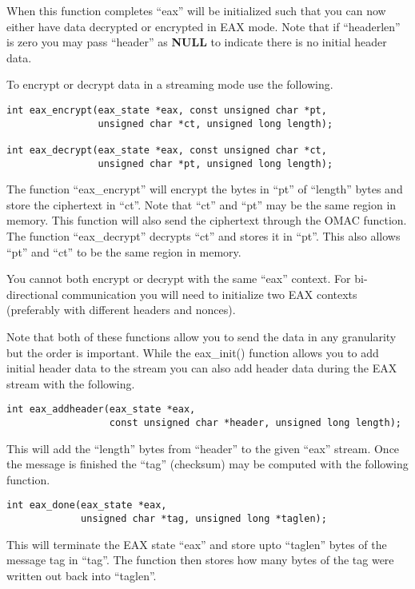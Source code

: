 \documentclass[a4paper]{book}
\begin{document}
When this function completes ``eax'' will be initialized such that you can now either have data decrypted or 
encrypted in EAX mode.  Note that if ``headerlen'' is zero you may pass ``header'' as \textbf{NULL} to indicate
there is no initial header data.

To encrypt or decrypt data in a streaming mode use the following.
 
\begin{verbatim}
int eax_encrypt(eax_state *eax, const unsigned char *pt, 
                unsigned char *ct, unsigned long length);

int eax_decrypt(eax_state *eax, const unsigned char *ct, 
                unsigned char *pt, unsigned long length);
\end{verbatim}
The function ``eax\_encrypt'' will encrypt the bytes in ``pt'' of ``length'' bytes and store the ciphertext in
``ct''.  Note that ``ct'' and ``pt'' may be the same region in memory.   This function will also send the ciphertext
through the OMAC function.  The function ``eax\_decrypt'' decrypts ``ct'' and stores it in ``pt''.  This also allows 
``pt'' and ``ct'' to be the same region in memory.  

You cannot both encrypt or decrypt with the same ``eax'' context.  For bi-directional communication you
will need to initialize two EAX contexts (preferably with different headers and nonces).  

Note that both of these functions allow you to send the data in any granularity but the order is important.  While
the eax\_init() function allows you to add initial header data to the stream you can also add header data during the
EAX stream with the following.

\begin{verbatim}
int eax_addheader(eax_state *eax, 
                  const unsigned char *header, unsigned long length);
\end{verbatim}

This will add the ``length'' bytes from ``header'' to the given ``eax'' stream.  Once the message is finished the 
``tag'' (checksum) may be computed with the following function.

\begin{verbatim}
int eax_done(eax_state *eax, 
             unsigned char *tag, unsigned long *taglen);
\end{verbatim}
This will terminate the EAX state ``eax'' and store upto ``taglen'' bytes of the message tag in ``tag''.  The function
then stores how many bytes of the tag were written out back into ``taglen''.
\end{document}
